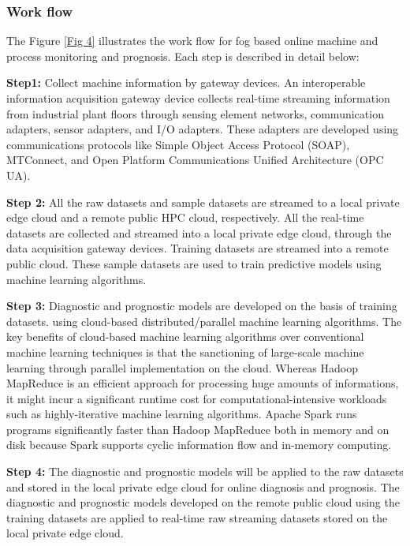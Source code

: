 \documentclass[10pt,a4paper,journal]{IEEEtran}
\begin{document}
\subsubsection{Work flow}

The Figure \ref{Fig 4} illustrates the work flow for fog based online machine and process monitoring and prognosis. Each step is described in detail below:

\textbf{Step1:} Collect machine information by gateway devices. An interoperable information acquisition gateway device collects real-time streaming information from industrial plant floors through sensing element networks, communication adapters, sensor adapters, and I/O adapters. These adapters are developed using communications protocols like Simple Object Access Protocol (SOAP), MTConnect, and Open Platform Communications Unified Architecture (OPC UA).

\textbf{Step 2:} All the raw datasets and sample datasets are streamed to a local private edge cloud and a remote public HPC cloud, respectively. All the real-time datasets are collected and streamed into a local private edge cloud, through the data acquisition gateway devices. Training datasets are streamed into a remote public cloud. These sample datasets are used to train predictive models using machine learning algorithms.

\textbf{Step 3:} Diagnostic and prognostic models are developed on the basis of training datasets. using cloud-based distributed/parallel machine learning algorithms. The key benefits of cloud-based machine learning algorithms over conventional machine learning techniques is that the sanctioning of large-scale machine learning through parallel implementation on the cloud. Whereas Hadoop MapReduce is an efficient approach for processing huge amounts of informations, it might incur a significant runtime cost for computational-intensive workloads such as highly-iterative machine learning algorithms. Apache Spark runs programs significantly faster than Hadoop MapReduce both in memory and on disk because Spark supports cyclic information flow and in-memory computing.

\textbf{Step 4:} The diagnostic and prognostic models will be applied to the raw datasets and stored in the local private edge cloud for online diagnosis and prognosis. The diagnostic and prognostic models developed on the remote public cloud using the training datasets are applied to real-time raw streaming datasets stored on the local private edge cloud. 
\end{document}
